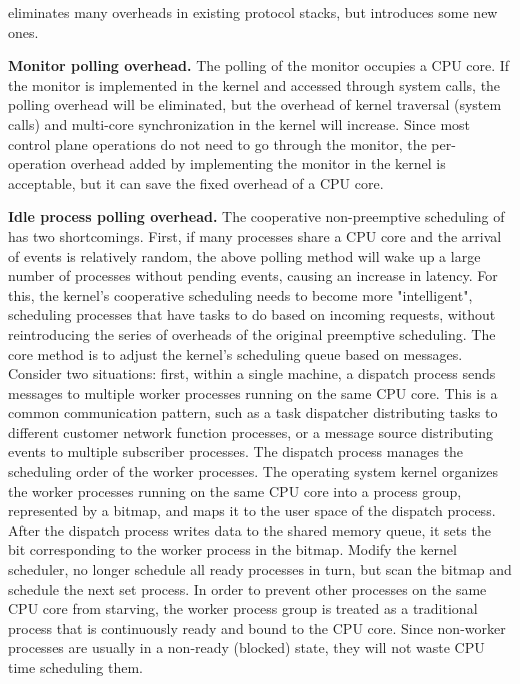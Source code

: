\sys{} eliminates many overheads in existing protocol stacks, but introduces some new ones.

\textbf{Monitor polling overhead.}
The polling of the monitor occupies a CPU core. If the monitor is implemented in the kernel and accessed through system calls, the polling overhead will be eliminated, but the overhead of kernel traversal (system calls) and multi-core synchronization in the kernel will increase. Since most control plane operations do not need to go through the monitor, the per-operation overhead added by implementing the monitor in the kernel is acceptable, but it can save the fixed overhead of a CPU core.

\textbf{Idle process polling overhead.}
The cooperative non-preemptive scheduling of \libipc{} has two shortcomings. First, if many processes share a CPU core and the arrival of events is relatively random, the above polling method will wake up a large number of processes without pending events, causing an increase in latency. For this, the kernel's cooperative scheduling needs to become more "intelligent", scheduling processes that have tasks to do based on incoming requests, without reintroducing the series of overheads of the original preemptive scheduling. The core method is to adjust the kernel's scheduling queue based on messages. Consider two situations: first, within a single machine, a dispatch process sends messages to multiple worker processes running on the same CPU core. This is a common communication pattern, such as a task dispatcher distributing tasks to different customer network function processes, or a message source distributing events to multiple subscriber processes. The dispatch process manages the scheduling order of the worker processes. The operating system kernel organizes the worker processes running on the same CPU core into a process group, represented by a bitmap, and maps it to the user space of the dispatch process. After the dispatch process writes data to the shared memory queue, it sets the bit corresponding to the worker process in the bitmap. Modify the kernel scheduler, no longer schedule all ready processes in turn, but scan the bitmap and schedule the next set process. In order to prevent other processes on the same CPU core from starving, the worker process group is treated as a traditional process that is continuously ready and bound to the CPU core. Since non-worker processes are usually in a non-ready (blocked) state, they will not waste CPU time scheduling them.


